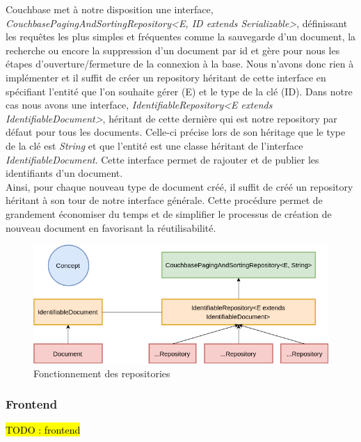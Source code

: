 	Couchbase met à notre disposition une interface, \textit{CouchbasePagingAndSortingRepository<E, ID extends Serializable>}, définissant les requêtes les plus simples et fréquentes comme la sauvegarde d'un document, la recherche ou encore la suppression d'un document par id et gère pour nous les étapes d'ouverture/fermeture de la connexion à la base. Nous n'avons donc rien à implémenter et il suffit de créer un repository héritant de cette interface en spécifiant l'entité que l'on souhaite gérer (E) et le type de la clé (ID). Dans notre cas nous avons une interface, \textit{IdentifiableRepository<E extends IdentifiableDocument>}, héritant de cette dernière qui est notre repository par défaut pour tous les documents. Celle-ci précise lors de son héritage que le type de la clé est \textit{String } et que l'entité est une classe héritant de l'interface \textit{IdentifiableDocument}. Cette interface permet de rajouter et de publier les identifiants d'un document. \\
	
	Ainsi, pour chaque nouveau type de document créé, il suffit de créé un repository héritant à son tour de notre interface générale. Cette procédure permet de grandement économiser du temps et de simplifier le processus de création de nouveau document en favorisant la réutilisabilité.

\begin{figure}[h!]
	\includegraphics[scale=0.55]{images/travailBP1818/piecesJustif/repository.png}
	\centering
	\caption{Fonctionnement des repositories}
	\label{repository}
\end{figure}

\subsubsection{Frontend}

\hl{TODO : frontend}